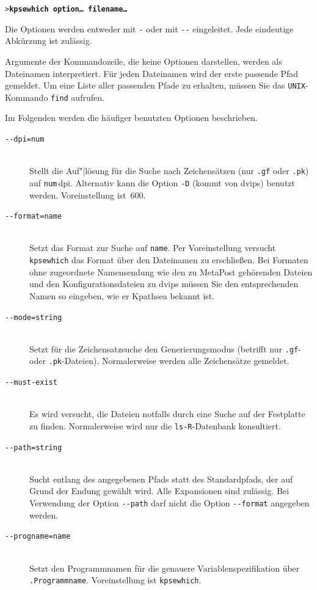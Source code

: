 \documentclass[12pt,ngerman,a4paper,fullparskip]{scrreprt}
\newcommand{\acro}[1]{\texttt{#1}}
\newcommand{\cmdname}[1]{\texttt{#1}}
\newcommand{\code}[1]{\texttt{#1}}
\newcommand{\file}[1]{\texttt{#1}}
\newcommand{\KPS}{Kpathsea\xspace}
\newcommand{\var}[1]{\texttt{#1}}
\newcommand{\samp}[1]{\texttt{#1}}
\newcommand{\Ucom}[1]{\textbf{\texttt{#1}}}
\def\MP{MetaPost}
\begin{document}
\begin{alltt}
> \Ucom{kpsewhich \var{option}{\dots} \var{filename}{\dots}}
\end{alltt}

Die Optionen werden entweder mit \samp{-} oder mit \samp{-{}-} eingeleitet.
Jede eindeutige Abkürzung ist zulässig.

Argumente der Kommandozeile, die keine Optionen darstellen, werden als
Datei\-na\-men interpretiert. Für jeden Dateinamen wird der erste passende
Pfad gemeldet. Um eine Liste aller passenden Pfade zu erhalten, müssen Sie
das \acro{UNIX}-Kommando \cmdname{find} aufrufen.

Im Folgenden werden die häufiger benutzten Optionen beschrieben.

\begin{description}
\item[\texttt{-{}-dpi=}\var{num}]\mbox{}\\
     Stellt die Auf"|lösung für die Suche nach Zeichensätzen
     (nur \file{.gf} oder \file{.pk}) auf \var{num}\,dpi. Alternativ
     kann die Option \code{-D} (kommt von dvips) benutzt werden.
     Voreinstellung ist~600.
\item[\texttt{-{}-format=}\var{name}]\mbox{}\\
     Setzt das Format zur Suche auf \var{name}. Per Voreinstellung
     versucht \cmdname{kpsewhich} das Format über den Dateinamen
     zu erschließen. Bei Formaten ohne zugeordnete Namens\-endung wie den
     zu {\MP} gehörenden Dateien und den Konfigurationsdateien zu
     {dvips} müssen Sie den entsprechenden Namen so eingeben, wie er
     \KPS{} bekannt ist.
\item[\texttt{-{}-mode=}\var{string}]\mbox{}\\
     Setzt für die Zeichensatzsuche den Generierungsmodus (betrifft nur
     \file{.gf}- oder \file{.pk}-Dateien). Normalerweise werden alle
     Zeichensätze gemeldet.
\item[\texttt{-{}-must-exist}]\mbox{}\\
     Es wird versucht, die Dateien notfalls durch eine Suche auf der
     Festplatte zu finden. Normalerweise wird nur die \file{ls-R}-Datenbank
     konsultiert.
\item[\texttt{-{}-path=}\var{string}]\mbox{}\\
     Sucht entlang des angegebenen Pfads statt des Standardpfads,
     der auf Grund der Endung gewählt wird. Alle Expansionen sind
     zulässig. Bei Verwendung der Option \texttt{-{}-path} darf nicht
     die Option \texttt{-{}-format} angegeben werden.
\item[\texttt{-{}-progname=}\var{name}]\mbox{}\\
     Setzt den Programmnamen für die genauere Variablenspezifikation
     über \newline  \code{.\var{Programmname}}. Voreinstellung ist \code{kpsewhich}.


\end{description}
\end{document}
